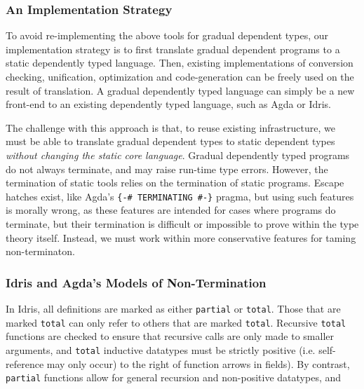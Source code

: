 \subsubsection{An Implementation Strategy}

To avoid re-implementing the above tools for gradual dependent types, our implementation
strategy is to first translate gradual dependent programs to a static dependently typed language.
Then, existing implementations of conversion checking, unification, optimization and code-generation
can be freely used on the result of translation.
A gradual dependently typed language can simply be a new front-end to an existing dependently typed language,
such as Agda or Idris.

The challenge with this approach is that, to reuse existing infrastructure,
we must be able to translate gradual dependent types to static dependent types
\textit{without changing the static core language}.
Gradual dependently typed programs do not always terminate,
and may raise run-time type errors.
However, the termination
of static tools relies on the termination of static programs.
Escape hatches exist, like Agda's \texttt{\{-\# TERMINATING \#-\}} pragma,
but using such features is morally wrong, as these features are intended for cases
where programs do terminate, but their termination is difficult or impossible to
prove within the type theory itself.
Instead, we must work within more conservative features for taming non-terminaton.

\subsubsection{Idris and Agda's Models of Non-Termination}

In Idris, all definitions are marked as either \texttt{partial} or \texttt{total}.
Those that are marked \texttt{total} can only refer to others
that are marked \texttt{total}. Recursive \texttt{total} functions are checked
to ensure that recursive calls are only made to smaller arguments, and \texttt{total}
inductive datatypes must be strictly positive (i.e. self-reference may only occur)
to the right of function arrows in fields).
By contrast, \texttt{partial} functions allow for general recursion and non-positive datatypes,
and

